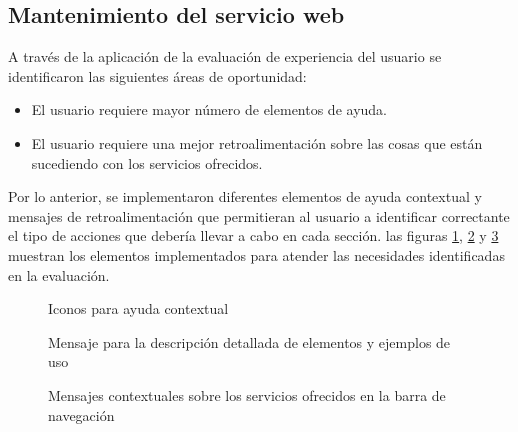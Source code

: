 \subsection{Mantenimiento del servicio web}

A trav\'es de la aplicaci\'on de la evaluaci\'on de experiencia del usuario se identificaron las siguientes \'areas de oportunidad: 

\begin{itemize}
    \item El usuario requiere mayor n\'umero de elementos de ayuda.
    \item El usuario requiere una mejor retroalimentaci\'on sobre las cosas que est\'an sucediendo con los servicios ofrecidos.
\end{itemize}{}

Por lo anterior, se implementaron diferentes elementos de ayuda contextual y mensajes de retroalimentaci\'on que permitieran al usuario a identificar correctante el tipo de acciones que deber\'ia llevar a cabo en cada secci\'on. las figuras \ref{ayudaContextual}, \ref{ayudaMensaje} y \ref{ayudaNavegacion} muestran los elementos implementados para atender las necesidades identificadas en la evaluaci\'on.\newline

\begin{figure}[!ht]
	\centering
    \caption{Iconos para ayuda contextual}
    \label{ayudaContextual}
\end{figure}

\begin{figure}[!ht]
	\centering
    \caption{Mensaje para la descripci\'on detallada de elementos y ejemplos de uso}
    \label{ayudaMensaje}
\end{figure}

\begin{figure}[!ht]
	\centering
    \caption{Mensajes contextuales sobre los servicios ofrecidos en la barra de navegaci\'on}
    \label{ayudaNavegacion}
\end{figure}

